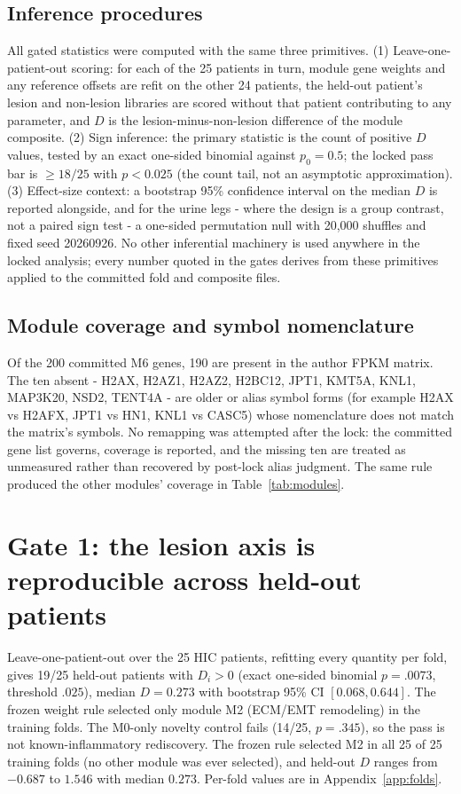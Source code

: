 \documentclass[11pt,a4paper]{article}
\begin{document}
\subsection{Inference procedures}
All gated statistics were computed with the same three primitives. (1)
Leave-one-patient-out scoring: for each of the 25 patients in turn, module
gene weights and any reference offsets are refit on the other 24 patients, the
held-out patient's lesion and non-lesion libraries are scored without that
patient contributing to any parameter, and $D$ is the lesion-minus-non-lesion
difference of the module composite. (2) Sign inference: the primary statistic
is the count of positive $D$ values, tested by an exact one-sided binomial
against $p_0=0.5$; the locked pass bar is $\geq 18/25$ with $p<0.025$ (the
count tail, not an asymptotic approximation). (3) Effect-size context: a
bootstrap 95\% confidence interval on the median $D$ is reported alongside,
and for the urine legs - where the design is a group contrast, not a paired
sign test - a one-sided permutation null with 20,000 shuffles and fixed seed
20260926. No other inferential machinery is used anywhere in the locked
analysis; every number quoted in the gates derives from these primitives
applied to the committed fold and composite files.

\subsection{Module coverage and symbol nomenclature}
Of the 200 committed M6 genes, 190 are present in the author FPKM matrix. The
ten absent - H2AX, H2AZ1, H2AZ2, H2BC12, JPT1, KMT5A, KNL1, MAP3K20, NSD2,
TENT4A - are older or alias symbol forms (for example H2AX vs H2AFX, JPT1 vs
HN1, KNL1 vs CASC5) whose nomenclature does not match the matrix's symbols.
No remapping was attempted after the lock: the committed gene list governs,
coverage is reported, and the missing ten are treated as unmeasured rather than
recovered by post-lock alias judgment. The same rule produced the other
modules' coverage in Table~\ref{tab:modules}.

\section{Gate 1: the lesion axis is reproducible across held-out patients}
Leave-one-patient-out over the 25 HIC patients, refitting every quantity per
fold, gives 19/25 held-out patients with $D_i>0$ (exact one-sided binomial
$p=.0073$, threshold $.025$), median $D=0.273$ with bootstrap 95\% CI
$[0.068,0.644]$. The frozen weight rule selected only module M2 (ECM/EMT
remodeling) in the training folds. The M0-only novelty control fails (14/25,
$p=.345$), so the pass is not known-inflammatory rediscovery. The frozen rule selected M2 in all 25 of 25 training folds (no other module was ever
selected), and held-out $D$ ranges from $-0.687$ to $1.546$ with median $0.273$.
Per-fold values are in Appendix~\ref{app:folds}.
\end{document}

